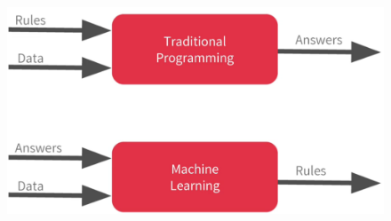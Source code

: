 \documentclass[10pt, compress]{beamer}
\begin{document}
\begin{frame}
  \vspace{.5cm}
  \begin{figure}
    \includegraphics[width=.9\linewidth]{imgs/coursera_moroney/1}
  \end{figure}
\end{frame}


%
%
%
\end{document}
